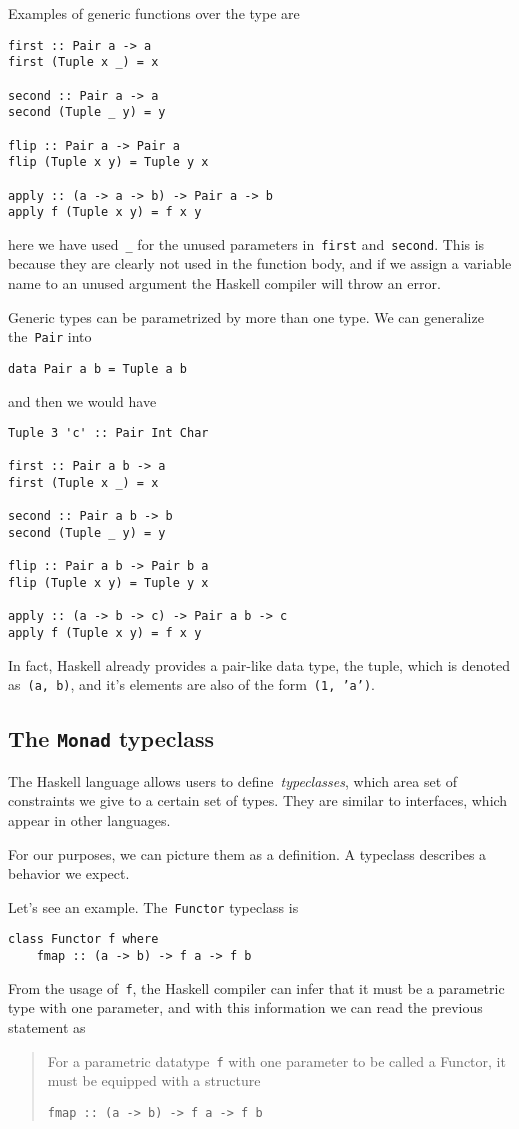\documentclass[../TFG.tex]{subfiles}
\begin{document}
Examples of generic functions over the type are
\begin{verbatim}
first :: Pair a -> a
first (Tuple x _) = x

second :: Pair a -> a
second (Tuple _ y) = y

flip :: Pair a -> Pair a
flip (Tuple x y) = Tuple y x

apply :: (a -> a -> b) -> Pair a -> b
apply f (Tuple x y) = f x y
\end{verbatim}
here we have used~\texttt{_} for the unused parameters
in~\texttt{first} and~\texttt{second}. This is because
they are clearly not used in the function body, and if we assign a variable name
to an unused argument the Haskell compiler will throw an error.

Generic types can be parametrized by more than one type. We can generalize
the~\texttt{Pair} into
\begin{verbatim}
data Pair a b = Tuple a b
\end{verbatim}
and then we would have
\begin{verbatim}
Tuple 3 'c' :: Pair Int Char

first :: Pair a b -> a
first (Tuple x _) = x

second :: Pair a b -> b
second (Tuple _ y) = y

flip :: Pair a b -> Pair b a
flip (Tuple x y) = Tuple y x

apply :: (a -> b -> c) -> Pair a b -> c
apply f (Tuple x y) = f x y
\end{verbatim}

In fact, Haskell already provides a pair-like data type, the tuple, which is
denoted as~\texttt{(a, b)}, and it's elements are also of the
form~\texttt{(1, 'a')}.

\subsection{The \texorpdfstring{\texttt{Monad}}{Monad} typeclass}
The Haskell language allows users to define~\emph{typeclasses}, which area set
of constraints we give to a certain set of types.
They are similar to interfaces, which appear in other languages.

For our purposes, we can picture them as a definition. A typeclass describes a
behavior we expect.

Let's see an example. The~\texttt{Functor} typeclass is
\begin{verbatim}
class Functor f where
    fmap :: (a -> b) -> f a -> f b
\end{verbatim}
From the usage of~\texttt{f}, the Haskell compiler can infer
that it must be a parametric type with one parameter, and
with this information we can read the previous statement as
\begin{quote}
    For a parametric datatype~\texttt{f} with one parameter to be
    called a Functor, it must be equipped with a structure

    \texttt{fmap :: (a -> b) -> f a -> f b}
\end{quote}
\end{document}
